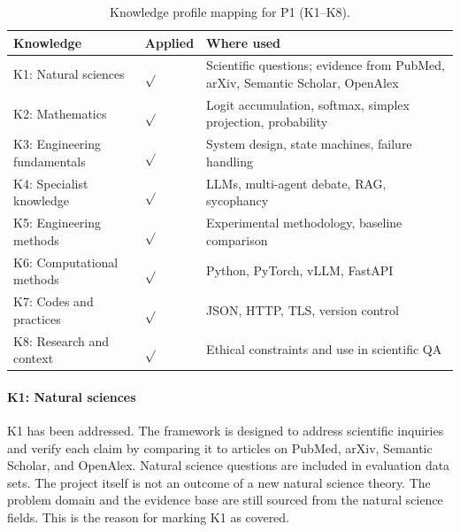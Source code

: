 \begin{center}
    \begin{table}[ht]
        \centering
        \caption{Knowledge profile mapping for P1 (K1--K8).}
        \renewcommand{\arraystretch}{1.6}
        \begin{tabular}{|p{}|p{}|p{}|}
            \hline
            Knowledge                    & Applied   & Where used                                                                    \\
            \hline
            K1: Natural sciences         & $\sqrt{}$ & Scientific questions; evidence from PubMed, arXiv, Semantic Scholar, OpenAlex \\
            \hline
            K2: Mathematics              & $\sqrt{}$ & Logit accumulation, softmax, simplex projection, probability                    \\
            \hline
            K3: Engineering fundamentals & $\sqrt{}$ & System design, state machines, failure handling                               \\
            \hline
            K4: Specialist knowledge     & $\sqrt{}$ & LLMs, multi-agent debate, RAG, sycophancy                                     \\
            \hline
            K5: Engineering methods      & $\sqrt{}$ & Experimental methodology, baseline comparison                                 \\
            \hline
            K6: Computational methods    & $\sqrt{}$ & Python, PyTorch, vLLM, FastAPI                                                \\
            \hline
            K7: Codes and practices      & $\sqrt{}$ & JSON, HTTP, TLS, version control                                              \\
            \hline
            K8: Research and context     & $\sqrt{}$ & Ethical constraints and use in scientific QA                                  \\
            \hline
        \end{tabular}
        \label{tab:knowledge}
    \end{table}
\end{center}

\paragraph{K1: Natural sciences} K1 has been addressed. The framework is designed to address scientific inquiries and verify each claim by comparing it to articles on PubMed, arXiv, Semantic Scholar, and OpenAlex. Natural science questions are included in evaluation data sets. The project itself is not an outcome of a new natural science theory. The problem domain and the evidence base are still sourced from the natural science fields. This is the reason for marking K1 as covered.

